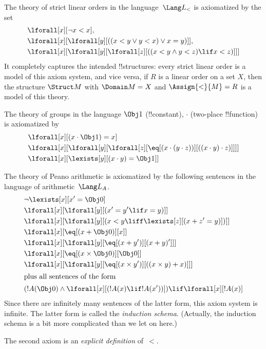 \documentclass[../../include/open-logic-section]{subfiles}
\begin{document}


\begin{ex}
The theory of strict linear orders in the language~$\Lang L_<$ is
axiomatized by the set
\begin{align*}
& \lforall[x][\lnot x < x], \\
& \lforall[x][\lforall[y][((x < y \lor y <
    x) \lor x = y)]], \\
& \lforall[x][\lforall[y][\lforall[z][((x < y
      \land y < z) \lif x < z)]]]
\end{align*}
It completely captures the intended !!{structure}s: every strict
linear order is a model of this axiom system, and vice versa, if $R$
is a linear order on a set $X$, then the structure $\Struct M$ with
$\Domain M = X$ and $\Assign{<}{M} = R$ is a model of this theory.
\end{ex}

\begin{ex}
The theory of groups in the language $\Obj 1$ (!!{constant}), $\cdot$
(two-place !!{function}) is axiomatized by
\begin{align*}
& \lforall[x][(x \cdot \Obj 1) = x]\\
& \lforall[x][\lforall[y][\lforall[z][\eq[(x \cdot (y \cdot z))][((x
          \cdot y) \cdot z)]]]]\\
& \lforall[x][\lexists[y][(x \cdot y) = \Obj 1]]
\end{align*}
\end{ex}

\begin{ex}
The theory of Peano arithmetic is axiomatized by the following
sentences in the language of arithmetic~$\Lang L_A$.
\begin{align*}
& \lnot\lexists[x][x' = \Obj 0]\\
& \lforall[x][\lforall[y][(x' = y' \lif x = y)]]\\
& \lforall[x][\lforall[y][(x < y \liff \lexists[z][(x + z' = y)])]]\\
& \lforall[x][\eq[(x + \Obj 0)][x]]\\
& \lforall[x][\lforall[y][\eq[(x + y')][(x + y)']]]\\
& \lforall[x][\eq[(x \times \Obj 0)][\Obj 0]]\\
& \lforall[x][\lforall[y][\eq[(x \times y')][((x \times y) + x)]]]\\
\intertext{plus all sentences of the form}
& (!A(\Obj 0) \land \lforall[x][(!A(x) \lif !A(x'))]) \lif \lforall[x][!A(x)]
\end{align*}
Since there are infinitely many sentences of the latter form, this
axiom system is infinite.  The latter form is called the
\emph{induction schema}. (Actually, the induction schema is a bit more
complicated than we let on here.)

The second axiom is an \emph{explicit definition} of~$<$.
\end{ex}
\end{document}

